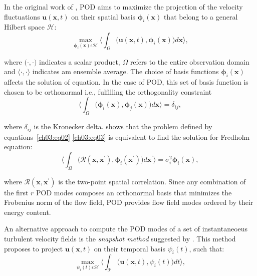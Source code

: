 In the original work of \citet{lumley1967structure}, POD aims to maximize the projection of the velocity fluctuations $\boldsymbol{u}(\boldsymbol{x}, t)$ on their spatial basis $\boldsymbol{\phi}_i(\boldsymbol{x})$ that belong to a general Hilbert space $\mathcal{H}$:
\begin{equation}
  \max_{\boldsymbol{\phi}_i(\boldsymbol{x})\epsilon\mathcal{H}}\biggl\langle\int_{\Omega} \bigl(\boldsymbol{u}(\boldsymbol{x}, t), \boldsymbol{\phi}_i(\boldsymbol{x})\bigl)d\boldsymbol{x}\biggl\rangle,
  \label{ch03:eq02}
\end{equation}

\noindent where $\bigl(\cdot,\cdot\bigl)$ indicates a scalar product, $\Omega$ refers to the entire observation domain and $\bigl\langle\cdot,\cdot\bigl\rangle$ indicates am ensemble average.
The choice of basis functions $\boldsymbol{\phi}_i(\boldsymbol{x})$ affects the solution of equation. In the case of POD, this set of basis function is chosen to be orthonormal i.e., fulfilling the orthogonality constraint
\begin{equation}
  \biggl\langle\int_{\Omega} \bigl(\boldsymbol{\phi}_i(\boldsymbol{x}), \boldsymbol{\phi}_j(\boldsymbol{x})\bigl)d\boldsymbol{x}\biggl\rangle=\delta_{ij},
  \label{ch03:eq03}
\end{equation}

\noindent where $\delta_{ij}$ is the Kronecker delta.
\citet{holmes2012turbulence} shows that the problem defined by equations~\ref{ch03:eq02}-\ref{ch03:eq03} is equivalent to find the solution for Fredholm equation:
\begin{equation}
  \biggl\langle\int_{\Omega} \bigl(\mathcal{R}(\boldsymbol{x},\boldsymbol{x}^{\prime}), \boldsymbol{\phi}_i(\boldsymbol{x^{\prime}})\bigl)d\boldsymbol{x^{\prime}}\biggl\rangle=\sigma_i^2\boldsymbol{\phi}_i(\boldsymbol{x}),
  \label{ch03:eq04}
\end{equation}

\noindent where $\mathcal{R}(\boldsymbol{x},\boldsymbol{x}^{\prime})$ is the two-point spatial correlation.
Since any combination of the first $r$ POD modes composes an orthonormal basis that minimizes the Frobenius norm of the flow field, POD provides flow field modes ordered by their energy content.

An alternative approach to compute the POD modes of a set of instantaneoeus turbulent velocity fields is the \textit{snapshot method} suggested by \citet{sirovich1987turbulence}.
This method proposes to project $\boldsymbol{u}(\boldsymbol{x}, t)$ on their temporal basis $\psi_i(t)$, such that:
\begin{equation}
  \max_{\psi_i(t)\epsilon\mathcal{H}}\biggl\langle\int_{\mathcal{T}} \bigl(\boldsymbol{u}(\boldsymbol{x}, t), \psi_i(t)\bigl)dt\biggl\rangle,
  \label{ch03:eq05}
\end{equation}

